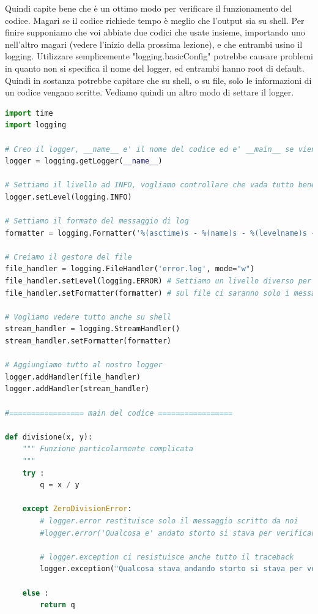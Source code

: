\documentclass[10pt,a4paper]{article}
\begin{document}
Quindi capite bene che è un ottimo modo per verificare il funzionamento del codice. Magari se il codice richiede tempo è meglio che l'output sia su shell. Per finire supponiamo che voi abbiate due codici che usate insieme, importando uno nell'altro magari (vedere l'inizio della prossima lezione), e che entrambi usino il logging. Utilizzare semplicemente "logging.basicConfig" potrebbe causare problemi in quanto non si specifica il nome del logger, ed entrambi hanno root di default. Quindi in sostanza potrebbe capitare che su shell, o su file, solo le informazioni di un codice vengano scritte. Vediamo quindi un altro modo di settare il logger.
\begin{lstlisting}[language=Python]
import time
import logging

# Creo il logger, __name__ e' il nome del codice ed e' __main__ se viene eseguito, __module__ se importato
logger = logging.getLogger(__name__)

# Settiamo il livello ad INFO, vogliamo controllare che vada tutto bene
logger.setLevel(logging.INFO)

# Settiamo il formato del messaggio di log
formatter = logging.Formatter('%(asctime)s - %(name)s - %(levelname)s - %(message)s')

# Creiamo il gestore del file
file_handler = logging.FileHandler('error.log', mode="w")
file_handler.setLevel(logging.ERROR) # Settiamo un livello diverso per il file 
file_handler.setFormatter(formatter) # sul file ci saranno solo i messaggi di errore

# Vogliamo vedere tutto anche su shell
stream_handler = logging.StreamHandler()
stream_handler.setFormatter(formatter)

# Aggiungiamo tutto al nostro logger
logger.addHandler(file_handler)
logger.addHandler(stream_handler)

#================= main del codice =================

def divisione(x, y):
    """ Funzione particolarmente complicata
    """
    try :
        q = x / y
    
    except ZeroDivisionError:
        # logger.error restituisce solo il messaggio scritto da noi
        #logger.error('Qualcosa e' andato storto si stava per verificare il second impact')
        
        # logger.exception ci resistuisce anche tutto il traceback
        logger.exception("Qualcosa stava andando storto si stava per verificare il second impact")
    
    else :
        return q


\end{lstlisting}
\end{document}
